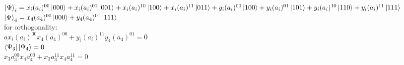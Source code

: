 \documentclass[a4paper,12pt]{article}
\begin{document}
\leavevmode
\newline \\


\leavevmode
\newline  \\
$\ket{\Psi}_{i}=x_{i}(a_{i})^{00}\ket{000}+x_{i}(a_{i})^{01}\ket{001}+x_{i}(a_{i})^{10}\ket{100}+x_{i}(a_{i})^{11}\ket{011}+y_{i}(a_{i})^{00}\ket{100}+y_{i}(a_{i})^{01}\ket{101}+y_{i}(a_{i})^{10}\ket{110}+y_{i}(a_{i})^{11}\ket{111}$
\leavevmode
\newline \\
$\ket{\Psi}_{4}=x_{4}(a_{4})^{00}\ket{000}+y_{4}(a_{4})^{01}\ket{111}$
\newline \\
for orthogonality:
\newline \\
$a x_{i}(a_{i})^{00}x_{4}(a_{4})^{00}+y_{i}(a_{i})^{11}y_{4}(a_{4})^{01}=0$
\newline \\
$\bra{\Psi_{3}}\ket{\Psi_{4}}=0 $ 
\newline \\
$x_{3}a_{3}^{00}x_{4}a_{4}^{00}+x_{3}a_{3}^{11}x_{4}a_{4}^{11}=0$
\end{document}
